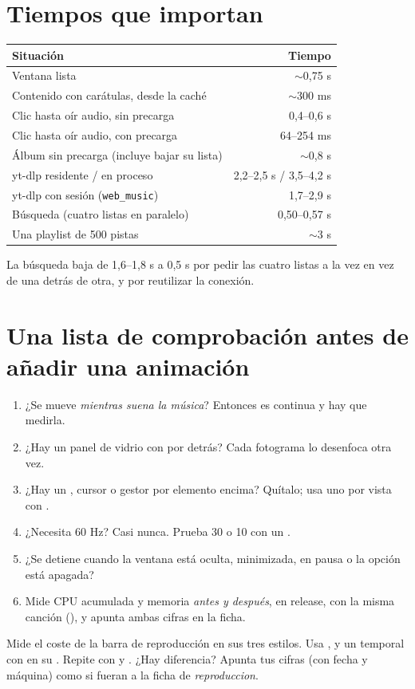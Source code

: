 \section{Tiempos que importan}

\begin{center}
\small
\begin{tabularx}{\linewidth}{@{}Xr@{}}
\toprule
Situación & Tiempo \\
\midrule
Ventana lista & $\sim$0,75 s \\
Contenido con carátulas, desde la caché & $\sim$300 ms \\
Clic hasta oír audio, sin precarga & 0,4--0,6 s \\
Clic hasta oír audio, con precarga & 64--254 ms \\
Álbum sin precarga (incluye bajar su lista) & $\sim$0,8 s \\
yt-dlp residente / en proceso & 2,2--2,5 s / 3,5--4,2 s \\
yt-dlp con sesión (\texttt{web\_music}) & 1,7--2,9 s \\
Búsqueda (cuatro listas en paralelo) & 0,50--0,57 s \\
Una playlist de 500 pistas & $\sim$3 s \\
\bottomrule
\end{tabularx}
\end{center}

La búsqueda baja de 1,6--1,8 s a 0,5 s por pedir las cuatro listas a la vez en vez de una
detrás de otra, y por reutilizar la conexión.

\section{Una lista de comprobación antes de añadir una animación}

\begin{enumerate}
  \item ¿Se mueve \emph{mientras suena la música}? Entonces es continua y hay que medirla.
  \item ¿Hay un panel de vidrio con  por detrás? Cada fotograma lo desenfoca
  otra vez.
  \item ¿Hay un , cursor o gestor por elemento encima? Quítalo; usa uno por
  vista con .
  \item ¿Necesita 60 Hz? Casi nunca. Prueba 30 o 10 con un .
  \item ¿Se detiene cuando la ventana está oculta, minimizada, en pausa o la opción está
  apagada?
  \item Mide CPU acumulada y memoria \emph{antes y después}, en release, con la misma canción
  (), y apunta ambas cifras en la ficha.
\end{enumerate}

\begin{ejercicio}
Mide el coste de la barra de reproducción en sus tres estilos. Usa ,
 y un  temporal con  en su
. Repite con  y . ¿Hay diferencia? Apunta tus cifras
(con fecha y máquina) como si fueran a la ficha de \emph{reproduccion}.
\end{ejercicio}
